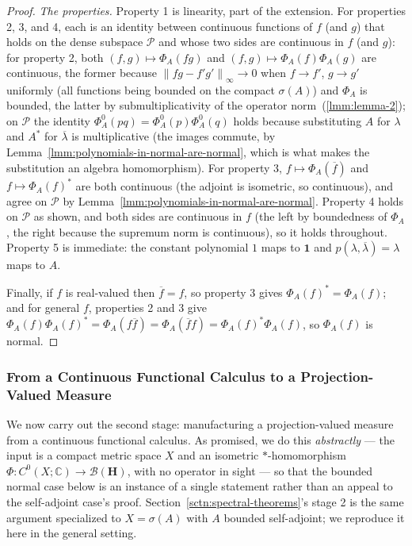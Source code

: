 \begin{proof}
\textit{The properties.} Property 1 is linearity, part of the extension. For properties 2, 3, and 4, each is an identity between continuous functions of $f$ (and $g$) that holds on the dense subspace $\mathcal{P}$ and whose two sides are continuous in $f$ (and $g$): for property 2, both $(f,g)\mapsto\Phi_A(fg)$ and $(f,g)\mapsto\Phi_A(f)\Phi_A(g)$ are continuous, the former because $\left\| fg - f'g' \right\|_\infty \to 0$ when $f\to f'$, $g \to g'$ uniformly (all functions being bounded on the compact $\sigma(A)$) and $\Phi_A$ is bounded, the latter by submultiplicativity of the operator norm~(\ref{lmm:lemma-2}); on $\mathcal{P}$ the identity $\Phi_A^0(pq) = \Phi_A^0(p)\Phi_A^0(q)$ holds because substituting $A$ for $\lambda$ and $A^*$ for $\overline\lambda$ is multiplicative (the images commute, by Lemma~\ref{lmm:polynomials-in-normal-are-normal}, which is what makes the substitution an algebra homomorphism). For property 3, $f \mapsto \Phi_A(\overline f)$ and $f \mapsto \Phi_A(f)^*$ are both continuous (the adjoint is isometric, so continuous), and agree on $\mathcal{P}$ by Lemma~\ref{lmm:polynomials-in-normal-are-normal}. Property 4 holds on $\mathcal{P}$ as shown, and both sides are continuous in $f$ (the left by boundedness of $\Phi_A$, the right because the supremum norm is continuous), so it holds throughout. Property 5 is immediate: the constant polynomial $1$ maps to $\mathbf{1}$ and $p(\lambda,\overline\lambda)=\lambda$ maps to $A$.

Finally, if $f$ is real-valued then $\overline f = f$, so property 3 gives $\Phi_A(f)^* = \Phi_A(f)$; and for general $f$, properties 2 and 3 give $\Phi_A(f)\Phi_A(f)^* = \Phi_A(f\overline f) = \Phi_A(\overline f f) = \Phi_A(f)^*\Phi_A(f)$, so $\Phi_A(f)$ is normal.
\end{proof}

\subsubsection{From a Continuous Functional Calculus to a Projection-Valued Measure}
We now carry out the second stage: manufacturing a projection-valued measure from a continuous functional calculus. As promised, we do this \textit{abstractly} — the input is a compact metric space $X$ and an isometric $*$-homomorphism $\Phi : C^0(X;\mathbb{C}) \to \mathcal{B}(\mathbf{H})$, with no operator in sight — so that the bounded normal case below is an instance of a single statement rather than an appeal to the self-adjoint case's proof. Section~\ref{sctn:spectral-theorems}'s stage 2 is the same argument specialized to $X = \sigma(A)$ with $A$ bounded self-adjoint; we reproduce it here in the general setting.

